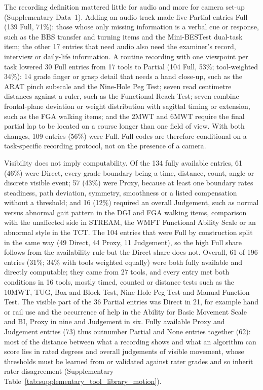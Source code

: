 \documentclass[11pt]{article}
\begin{document}
The recording definition mattered little for audio and more for camera set-up (Supplementary Data~1). Adding an audio track made five Partial entries Full (139 Full, 71\%): those whose only missing information is a verbal cue or response, such as the BBS transfer and turning items and the Mini-BESTest dual-task item; the other 17 entries that need audio also need the examiner's record, interview or daily-life information. A routine recording with one viewpoint per task lowered 30 Full entries from 17 tools to Partial (104 Full, 53\%; tool-weighted 34\%): 14 grade finger or grasp detail that needs a hand close-up, such as the ARAT pinch subscale and the Nine-Hole Peg Test; seven read centimetre distances against a ruler, such as the Functional Reach Test; seven combine frontal-plane deviation or weight distribution with sagittal timing or extension, such as the FGA walking items; and the 2MWT and 6MWT require the final partial lap to be located on a course longer than one field of view. With both changes, 109 entries (56\%) were Full. Full codes are therefore conditional on a task-specific recording protocol, not on the presence of a camera.

Visibility does not imply computability. Of the 134 fully available entries, 61 (46\%) were Direct, every grade boundary being a time, distance, count, angle or discrete visible event; 57 (43\%) were Proxy, because at least one boundary rates steadiness, path deviation, symmetry, smoothness or a listed compensation without a threshold; and 16 (12\%) required an overall Judgement, such as normal versus abnormal gait pattern in the DGI and FGA walking items, comparison with the unaffected side in STREAM, the WMFT Functional Ability Scale or an abnormal style in the TCT. The 104 entries that were Full by construction split in the same way (49 Direct, 44 Proxy, 11 Judgement), so the high Full share follows from the availability rule but the Direct share does not. Overall, 61 of 196 entries (31\%; 34\% with tools weighted equally) were both fully available and directly computable; they came from 27 tools, and every entry met both conditions in 16 tools, mostly timed, counted or distance tests such as the 10MWT, TUG, Box and Block Test, Nine-Hole Peg Test and Manual Function Test. The visible part of the 36 Partial entries was Direct in 21, for example hand or rail use and the occurrence of help in the Ability for Basic Movement Scale and BI, Proxy in nine and Judgement in six. Fully available Proxy and Judgement entries (73) thus outnumber Partial and None entries together (62): most of the distance between what a recording shows and what an algorithm can score lies in rated degrees and overall judgements of visible movement, whose thresholds must be learned from or validated against rater grades and so inherit rater disagreement (Supplementary Table~\ref{tab:supplementary_tool_library_motion}).
\end{document}
